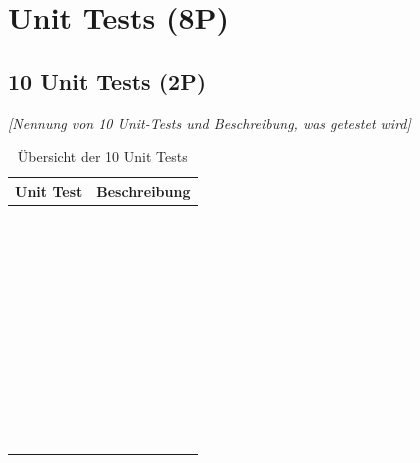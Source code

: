 
\titlespacing*{\chapter}{0pt}{-30mm}{10pt}
  
\chapter{Unit Tests (8P)}
\pagestyle{scrheadings}
\clearscrheadfoot
{}
\setcounter{page}{5}
\ofoot[\pagemark]{\pagemark}
\onehalfspacing

\section{10 Unit Tests (2P)}
\emph{[Nennung von 10 Unit-Tests und Beschreibung, was getestet wird]}

\begin{table}[htbp]
\centering
    \begin{tabular}{|l|l|}
        \hline
        \textbf{Unit Test} & \textbf{Beschreibung} \\ \hline
        ~         & ~            \\ \hline
        ~         & ~            \\ \hline
        ~         & ~            \\ \hline
        ~         & ~            \\ \hline
        ~         & ~            \\ \hline
        ~         & ~            \\ \hline
        ~         & ~            \\ \hline
        ~         & ~            \\ \hline
        ~         & ~            \\ \hline
        ~         & ~            \\
        \hline
    \end{tabular}
    \label{Tab:unit_test_table}
    \caption{Übersicht der 10 Unit Tests}
\end{table}

